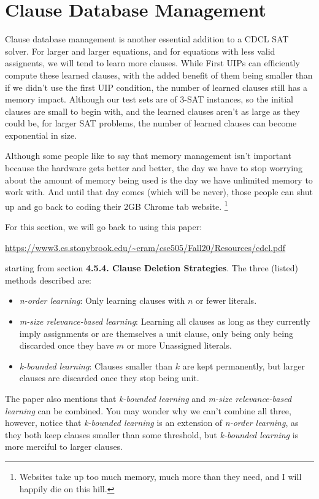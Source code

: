 \section{Clause Database Management}

Clause database management is another essential addition to a CDCL SAT solver. 
For larger and larger equations, and for equations with less valid assignents, 
we will tend to learn more clauses. While First UIPs can efficiently compute 
these learned clauses, with the added benefit of them being smaller than if we 
didn't use the first UIP condition, the number of learned clauses still has a 
memory impact. Although our test sets are of 3-SAT instances, so the initial 
clauses are small to begin with, and the learned clauses aren't as large as they 
could be, for larger SAT problems, the number of learned clauses can become exponential
in size. 

Although some people like to say that memory management isn't important because the 
hardware gets better and better, the day we have to stop worrying about the amount 
of memory being used is the day we have unlimited memory to work with. And until that 
day comes (which will be never), those people can shut up and go back to coding their 
2GB Chrome tab website. 
\footnote{Websites take up too much memory, much more than they need, 
and I will happily die on this hill.}

For this section, we will go back to using this paper:
\begin{center}
    \small{\url{https://www3.cs.stonybrook.edu/~cram/cse505/Fall20/Resources/cdcl.pdf}}
\end{center}
starting from section \textbf{4.5.4. Clause Deletion Strategies}.
The three (listed) methods described are:
\begin{itemize}
    \item \textit{n-order learning}: Only learning clauses with $n$ or fewer literals.
    \item \textit{m-size relevance-based learning}: Learning all clauses as long as they 
            currently imply assignments or are themselves a unit clause, only being
            only being discarded once they have $m$ or more Unassigned literals.
    \item \textit{k-bounded learning}: Clauses smaller than $k$ are kept permanently,
            but larger clauses are discarded once they stop being unit.
\end{itemize}
\noindent
The paper also mentions that \textit{k-bounded learning} and \textit{m-size relevance-based learning}
can be combined. You may wonder why we can't combine all three, however, notice that 
\textit{k-bounded learning} is an extension of \textit{n-order learning}, as they both keep 
clauses smaller than some threshold, but \textit{k-bounded learning} is more merciful to 
larger clauses.

